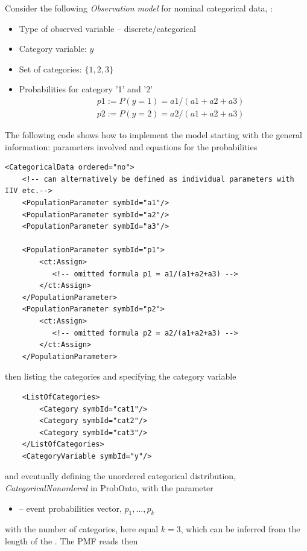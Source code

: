 {Consider the following \emph{Observation model} for nominal categorical 
data, \cite{Swat:2014bb}:

\begin{itemize}
\item
Type of observed variable -- discrete/categorical
\item
Category variable: $y$
\item
Set of categories: $\{1,2,3\}$
\item
Probabilities for category '1' and '2'
\begin{eqnarray}
&& p1 := P(y=1) = a1/(a1+a2+a3)  \nonumber \\
&& p2 := P(y=2) = a2/(a1+a2+a3)  \nonumber 
\end{eqnarray}
\end{itemize}
The following code shows how to implement the model 
starting with the general information: parameters involved and equations
for the probabilities 
\lstset{language=XML}
\begin{lstlisting}
<CategoricalData ordered="no">
    <!-- can alternatively be defined as individual parameters with IIV etc.-->
    <PopulationParameter symbId="a1"/> 
    <PopulationParameter symbId="a2"/>
    <PopulationParameter symbId="a3"/>
    
    <PopulationParameter symbId="p1">
        <ct:Assign>
           <!-- omitted formula p1 = a1/(a1+a2+a3) -->	
        </ct:Assign>
    </PopulationParameter>
    <PopulationParameter symbId="p2">
        <ct:Assign>
           <!-- omitted formula p2 = a2/(a1+a2+a3) -->	
        </ct:Assign>
    </PopulationParameter>
\end{lstlisting}
then listing the categories and specifying the category variable
\lstset{language=XML}
\begin{lstlisting}
    <ListOfCategories> 
        <Category symbId="cat1"/>
        <Category symbId="cat2"/>
        <Category symbId="cat3"/>
    </ListOfCategories>                    
    <CategoryVariable symbId="y"/>
\end{lstlisting}
and eventually defining the unordered categorical distribution, \emph{CategoricalNonordered} 
in ProbOnto, with the parameter
\begin{itemize}
\item 
{}  -- event probabilities vector, $p_1, \ldots, p_k$
\end{itemize}
with the number of categories, here equal $k\!=\!3$, which can be inferred from the length of the 
. The PMF reads then

}
